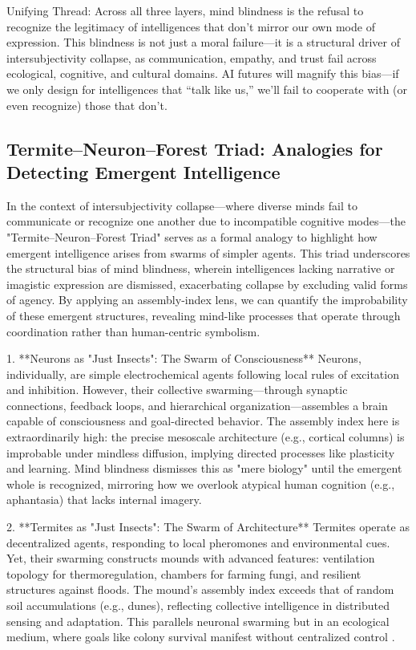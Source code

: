 \documentclass{article}
\begin{document}
Unifying Thread: Across all three layers, mind blindness is the refusal to recognize the legitimacy of intelligences that don’t mirror our own mode of expression. This blindness is not just a moral failure—it is a structural driver of intersubjectivity collapse, as communication, empathy, and trust fail across ecological, cognitive, and cultural domains. AI futures will magnify this bias—if we only design for intelligences that “talk like us,” we’ll fail to cooperate with (or even recognize) those that don’t.

\subsection{Termite–Neuron–Forest Triad: Analogies for Detecting Emergent Intelligence}
In the context of intersubjectivity collapse—where diverse minds fail to communicate or recognize one another due to incompatible cognitive modes—the "Termite–Neuron–Forest Triad" serves as a formal analogy to highlight how emergent intelligence arises from swarms of simpler agents. This triad underscores the structural bias of mind blindness, wherein intelligences lacking narrative or imagistic expression are dismissed, exacerbating collapse by excluding valid forms of agency. By applying an assembly-index lens, we can quantify the improbability of these emergent structures, revealing mind-like processes that operate through coordination rather than human-centric symbolism.

1. **Neurons as "Just Insects": The Swarm of Consciousness**  
   Neurons, individually, are simple electrochemical agents following local rules of excitation and inhibition. However, their collective swarming—through synaptic connections, feedback loops, and hierarchical organization—assembles a brain capable of consciousness and goal-directed behavior. The assembly index here is extraordinarily high: the precise mesoscale architecture (e.g., cortical columns) is improbable under mindless diffusion, implying directed processes like plasticity and learning. Mind blindness dismisses this as "mere biology" until the emergent whole is recognized, mirroring how we overlook atypical human cognition (e.g., aphantasia) that lacks internal imagery.

2. **Termites as "Just Insects": The Swarm of Architecture**  
   Termites operate as decentralized agents, responding to local pheromones and environmental cues. Yet, their swarming constructs mounds with advanced features: ventilation topology for thermoregulation, chambers for farming fungi, and resilient structures against floods. The mound's assembly index exceeds that of random soil accumulations (e.g., dunes), reflecting collective intelligence in distributed sensing and adaptation. This parallels neuronal swarming but in an ecological medium, where goals like colony survival manifest without centralized control \citep{turner2000, camazine2001}.
\end{document}
